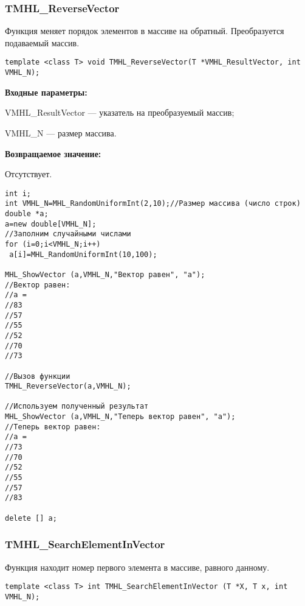 \documentclass[a4paper,12pt]{article}
\begin{document}
\subsubsection{TMHL\_ReverseVector}\label{TMHL_ReverseVector}

Функция меняет порядок элементов в массиве на обратный. Преобразуется подаваемый массив.


\begin{lstlisting}[label=code_syntax_TMHL_ReverseVector,caption=Синтаксис]
template <class T> void TMHL_ReverseVector(T *VMHL_ResultVector, int VMHL_N);
\end{lstlisting}

\textbf{Входные параметры:}  
 
VMHL\_ResultVector --- указатель на преобразуемый массив;
 
VMHL\_N --- размер массива.

\textbf{Возвращаемое значение:}

Отсутствует.


\begin{lstlisting}[label=code_use_TMHL_ReverseVector,caption=Пример использования]
int i;
int VMHL_N=MHL_RandomUniformInt(2,10);//Размер массива (число строк)
double *a;
a=new double[VMHL_N];
//Заполним случайными числами
for (i=0;i<VMHL_N;i++)
 a[i]=MHL_RandomUniformInt(10,100);

MHL_ShowVector (a,VMHL_N,"Вектор равен", "a");
//Вектор равен:
//a =
//83
//57
//55
//52
//70
//73

//Вызов функции
TMHL_ReverseVector(a,VMHL_N);

//Используем полученный результат
MHL_ShowVector (a,VMHL_N,"Теперь вектор равен", "a");
//Теперь вектор равен:
//a =
//73
//70
//52
//55
//57
//83

delete [] a;
\end{lstlisting}

\subsubsection{TMHL\_SearchElementInVector}\label{TMHL_SearchElementInVector}

Функция находит номер первого элемента в массиве, равного данному.


\begin{lstlisting}[label=code_syntax_TMHL_SearchElementInVector,caption=Синтаксис]
template <class T> int TMHL_SearchElementInVector (T *X, T x, int VMHL_N);
\end{lstlisting}
\end{document}
